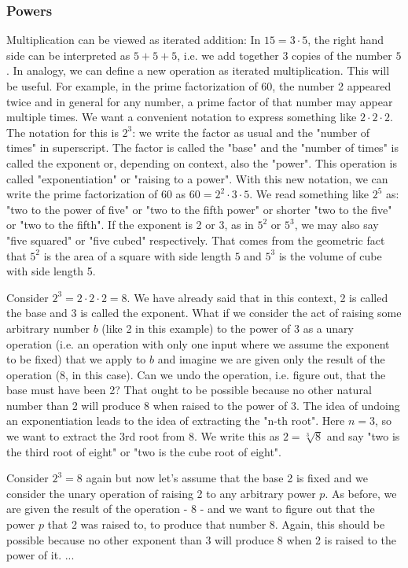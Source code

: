 \subsubsection{Powers}
Multiplication can be viewed as iterated addition: In $15 = 3 \cdot 5$, the right hand side can be interpreted as $5 + 5 + 5$, i.e. we add together $3$ copies of the number $5$. In analogy, we can define a new operation as iterated multiplication. This will be useful. For example, in the prime factorization of 60, the number 2 appeared twice and in general for any number, a prime factor of that number may appear multiple times. We want a convenient notation to express something like $2 \cdot 2 \cdot 2$. The notation for this is $2^3$: we write the factor as usual and the "number of times" in superscript. The factor is called the "base" and the "number of times" is called the exponent or, depending on context, also the "power". This operation is called "exponentiation" or "raising to a power". With this new notation, we can write the prime factorization of 60 as $60 = 2^2 \cdot 3 \cdot 5$.  We read something like $2^5$ as: "two to the power of five" or "two to the fifth power" or shorter "two to the five" or "two to the fifth". If the exponent is 2 or 3, as in $5^2$ or $5^3$, we may also say "five squared" or "five cubed" respectively. That comes from the geometric fact that $5^2$ is the area of a square with side length $5$ and $5^3$ is the volume of cube with side length 5.

\medskip
Consider $2^3 = 2 \cdot 2 \cdot 2 = 8$. We have already said that in this context, 2 is called the base and 3 is called the exponent. What if we consider the act of raising some arbitrary number $b$ (like 2 in this example) to the power of 3 as a unary operation (i.e. an operation with only one input where we assume the exponent to be fixed) that we apply to $b$ and imagine we are given only the result of the operation (8, in this case). Can we undo the operation, i.e. figure out, that the base must have been 2? That ought to be possible because no other natural number than 2 will produce 8 when raised to the power of 3. The idea of undoing an exponentiation leads to the idea of extracting the "n-th root". Here $n = 3$, so we want to extract the 3rd root from 8. We write this as $2 =\sqrt[3]{8}$ and say "two is the third root of eight" or  "two is the cube root of eight".

\medskip
Consider $2^3 = 8$ again but now let's assume that the base 2 is fixed and we consider the unary operation of raising 2 to any arbitrary power $p$. As before, we are given the result of the operation - 8 - and we want to figure out that the power $p$ that 2 was raised to, to produce that number 8. Again, this should be possible because no other exponent than 3 will produce 8 when 2 is raised to the power of it. ...

